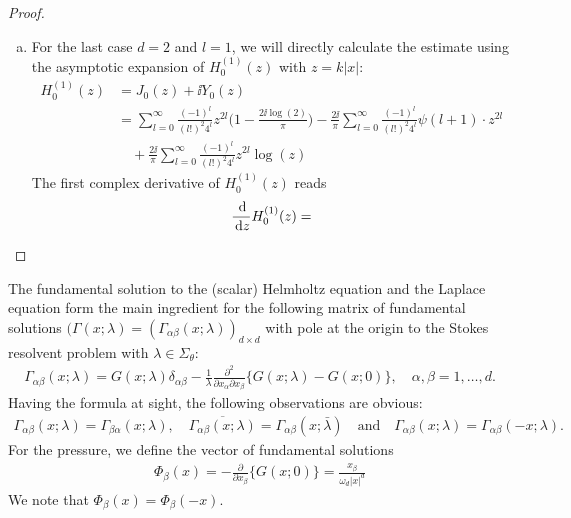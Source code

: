 \begin{proof}
\begin{enumerate}[(a)]
  \item For the last case $d = 2$ and $l = 1$, we will directly calculate the estimate using the asymptotic expansion of $H_0^{(1)}(z)$ with $z = k|x|$:
    \begin{align*}
      H_0^{(1)}(z) 
      &= J_0(z) + \ii Y_0(z) \\
      &= \sum_{l = 0}^\infty \frac{(-1)^l}{(l!)^2 4^l} z^{2l} \big( 1 - \frac{2\ii \log(2)}{\pi} \big) 
      - \frac{2 \ii}{\pi} \sum_{l = 0}^\infty \frac{(-1)^l}{(l!)^2 4^l} \psi(l + 1) \cdot z^{2l} \\
      &\quad + \frac{2\ii}{\pi} \sum_{l = 0}^\infty \frac{(-1)^l}{(l!)^2 4^l} z^{2l} \log(z)
    \end{align*}
    The first complex derivative of $H_0^{(1)}(z)$ reads
    \begin{align*}
      \frac{\, {\operatorname{d}\!{}}}{\, {\operatorname{d}\!{z}}} H_0^{(1)}(z) = 
    \end{align*}

  \end{enumerate}
\end{proof}

  The fundamental solution to the (scalar) Helmholtz equation and the Laplace equation form the main ingredient for the following matrix of fundamental solutions $(\Gamma(x;\lambda) = (\Gamma_{\alpha\beta}(x;\lambda))_{d \times d}$ with pole at the origin to the Stokes resolvent problem with $\lambda \in \Sigma_\theta$:
  \begin{align}
    \label{eq:fundamentalMatrixStokes}
    \Gamma_{\alpha\beta}(x;\lambda) = G(x; \lambda) \delta_{\alpha\beta} - \frac{1}{\lambda} \frac{\partial^2}{\partial x_\alpha \partial x_\beta} \{ G(x; \lambda) - G(x; 0) \}, \quad \alpha,\beta = 1,\dots,d.
  \end{align}
  Having the formula at sight, the following observations are obvious:
  \begin{align*}
    \Gamma_{\alpha\beta}(x; \lambda) = \Gamma_{\beta\alpha}(x; \lambda), \quad 
    \overline{\Gamma_{\alpha\beta}(x; \lambda)} = \Gamma_{\alpha\beta}(x; \bar\lambda)
    \quad\text{and}\quad
    \Gamma_{\alpha\beta}(x; \lambda) = \Gamma_{\alpha\beta}(-x; \lambda).
  \end{align*}
  For the pressure, we define the vector of fundamental solutions
  \begin{align}
    \label{eq:fundamentalVectorPressure}
      \Phi_\beta(x) = -\frac{\partial}{\partial x_\beta} \{ G(x; 0) \} = \frac{x_\beta}{\omega_d |x|^d}
  \end{align}
  We note that $\Phi_\beta(x) = \Phi_\beta(-x)$.

